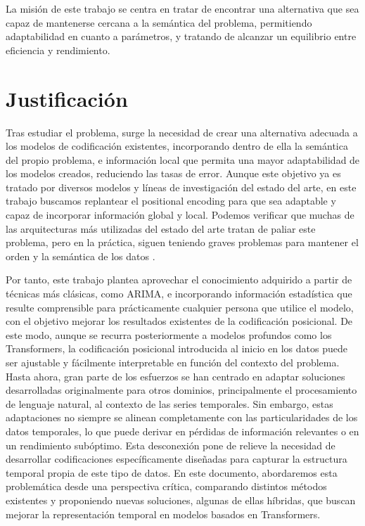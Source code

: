 La misión de este trabajo se centra en tratar de encontrar una alternativa que sea capaz de mantenerse cercana a la semántica del problema, permitiendo adaptabilidad en cuanto a parámetros, y tratando de alcanzar un equilibrio entre eficiencia y rendimiento.\\

\section{Justificación}

Tras estudiar el problema, surge la necesidad de crear una alternativa adecuada a los modelos de codificación existentes, incorporando dentro de ella la semántica del propio problema, e información local que permita una mayor adaptabilidad de los modelos creados, reduciendo las tasas de error. Aunque este objetivo ya es tratado por diversos modelos y líneas de investigación del estado del arte, en este trabajo buscamos replantear el positional encoding para que sea adaptable y capaz de incorporar información global y local. Podemos verificar que muchas de las arquitecturas más utilizadas del estado del arte tratan de paliar este problema, pero en la práctica, siguen teniendo graves problemas para mantener el orden y la semántica de los datos \cite{zeng2022transformerseffectivetimeseries}.

Por tanto, este trabajo plantea aprovechar el conocimiento adquirido a partir de técnicas más clásicas, como ARIMA, e incorporando información estadística que resulte comprensible para prácticamente cualquier persona que utilice el modelo, con el objetivo mejorar los resultados existentes de la codificación posicional. De este modo, aunque se recurra posteriormente a modelos profundos como los Transformers, la codificación posicional introducida  al inicio en los datos puede ser ajustable y fácilmente interpretable en función del contexto del problema.\\
 
Hasta ahora, gran parte de los esfuerzos se han centrado en adaptar soluciones desarrolladas originalmente para otros dominios, principalmente el procesamiento de lenguaje natural, al contexto de las series temporales. Sin embargo, estas adaptaciones no siempre se alinean completamente con las particularidades de los datos temporales, lo que puede derivar en pérdidas de información relevantes o en un rendimiento subóptimo. Esta desconexión pone de relieve la necesidad de desarrollar codificaciones específicamente diseñadas para capturar la estructura temporal propia de este tipo de datos. En este documento, abordaremos esta problemática desde una perspectiva crítica, comparando distintos métodos existentes y proponiendo nuevas soluciones, algunas de ellas híbridas, que buscan mejorar la representación temporal en modelos basados en Transformers.

